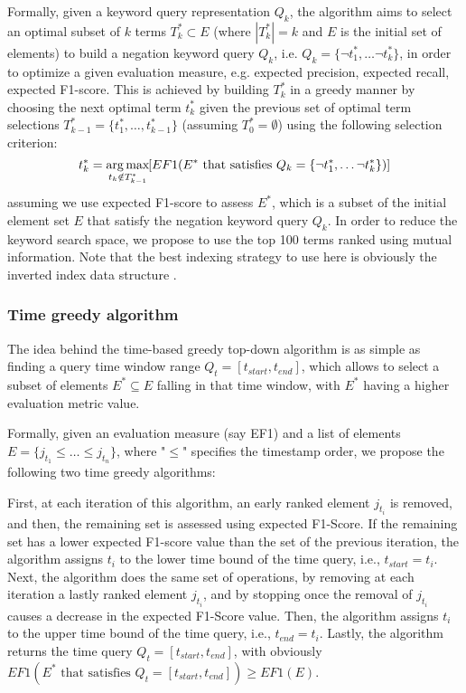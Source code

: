 Formally, given a keyword query representation $Q_k$, the algorithm aims to select an
optimal subset of $k$ terms $T_{k}^{*}\subset E$ (where $|T_{k}^{*}|=k$ and $E$ is the initial set of elements) to build a negation keyword query $Q_k$, i.e. $Q_k=\{\neg t_{1}^{*},\dots \neg t_{k}^{*}\}$, in order to optimize a given evaluation measure, e.g. expected precision, expected recall, expected F1-score. This is achieved by
building $T_{k}^{*}$ in a greedy manner by choosing the next optimal
term $t_{k}^{*}$ given the previous set of optimal term selections
$T_{k-1}^{*}=\{t_{1}^{*},\ldots,t_{k-1}^{*}\}$ (assuming $T_{0}^{*}=\emptyset$)
using the following selection criterion:
\begin{equation}
t_{k}^{*}=\operatorname*{arg\,max}_{t_{k}\notin T_{k-1}^{*}}\hspace{-0.3mm}[EF1(E^{*} \textrm{ that satisfies } Q_k=\{\neg t_{1}^{*},\dots \neg t_{k}^{*}\})]
\end{equation}
assuming we use expected F1-score to assess  $E^{*}$, which is a subset of the initial element set $E$ that satisfy the negation keyword query $Q_k$. In order to reduce the keyword search space, we propose to use the top 100 terms ranked using mutual information. Note that the best indexing strategy to use here is obviously the inverted index data structure \cite{Zobel2006}.

\subsubsection{Time greedy algorithm}
The idea behind the time-based greedy top-down algorithm is as simple as finding a query time window range $Q_t=[t_{start},t_{end}]$, which allows to select a subset of elements $E^{*}\subseteq E$ falling in that time window, with $E^{*}$ having a higher evaluation metric value. 

Formally, given an evaluation measure (say EF1) and a list of elements $E=\{j_{t_1}\leq \dots \leq j_{t_n}\}$, where "$\leq$" specifies the timestamp order, we propose the following two time greedy algorithms:

 First, at each iteration of this algorithm, an early ranked element $j_{t_i}$ is removed, and then, the remaining set is assessed using expected F1-Score. If the remaining set has a lower expected F1-score value than the set of the previous iteration, the algorithm assigns $t_i$ to the lower time bound of the time query, i.e., $t_{start}=t_i$. 
Next, the algorithm does the same set of operations, by removing at each iteration a lastly ranked element  $j_{t_i}$, and by stopping once the removal of  $j_{t_i}$ causes a decrease in the expected F1-Score value. Then, the algorithm assigns $t_i$ to the upper time bound of the time query, i.e., $t_{end}=t_i$. 
Lastly, the algorithm returns the  time query $Q_t=[t_{start},t_{end}]$, with obviously $EF1(E^{*} \textrm{ that satisfies } Q_t=[t_{start},t_{end}]) \geq EF1(E)$.

